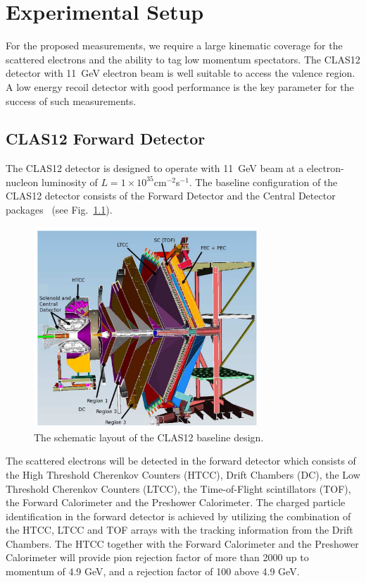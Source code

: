 \chapter{Experimental Setup}
\label{chap:setting}


For the proposed measurements, we require a large kinematic coverage for the 
scattered electrons and the ability to tag low momentum spectators. The CLAS12 
detector with 11~GeV electron beam is well suitable to access the valence 
region. A low energy recoil detector with good performance is the key parameter 
for the success of such measurements.

\section{CLAS12 Forward Detector}

The CLAS12 detector is designed to operate with 11~GeV beam at a 
electron-nucleon luminosity of $L = 1\times10^{35}$cm$^{-2}$s$^{-1}$. The 
baseline configuration of the CLAS12 detector consists of the Forward Detector 
and the Central Detector packages~\cite{CD} (see Fig.~\ref{fig:fd}).

\begin{figure}
  \begin{center}
    \includegraphics[angle=0, width=0.75\textwidth]{./../Detector/fig-chap2/fd}
    \caption{The schematic layout of the CLAS12 baseline design.}
    \label{fig:fd}
  \end{center}
\end{figure}

The scattered electrons will be detected in the forward detector which consists 
of the High Threshold Cherenkov Counters (HTCC), Drift Chambers (DC), the Low 
Threshold Cherenkov Counters (LTCC), the Time-of-Flight scintillators (TOF), 
the Forward Calorimeter and the Preshower Calorimeter. The charged particle 
identification in the forward detector is achieved by utilizing the combination 
of the HTCC, LTCC and TOF arrays with the tracking information from the Drift 
Chambers. The HTCC together with the Forward Calorimeter and the Preshower 
Calorimeter will provide pion rejection factor of more than 2000 up to momentum 
of 4.9 GeV, and a rejection factor of 100 above 4.9 GeV.

